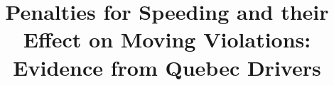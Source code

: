 \documentclass[proof]{cje}
\begin{document}
\label{firstpage}

\title[Penalties for Speeding and their Effect on Moving Violations]{Penalties for Speeding and their Effect on Moving Violations: Evidence from Quebec Drivers}







%
%                  
%


\abstract{

         

         }

%
%        
%


\maketitle
















% 


\vfill
\eject


\clearpage






\clearpage





\end{document}
